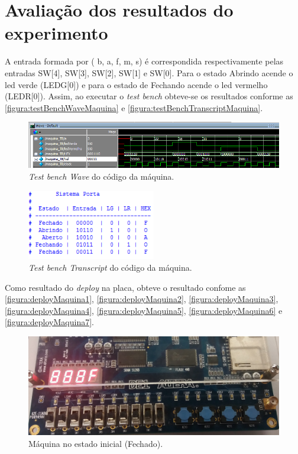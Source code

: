 \chapter{Avaliação dos resultados do experimento}
	A entrada formada por ( b, a, f, m, s) é correspondida respectivamente pelas entradas
	SW[4], SW[3], SW[2], SW[1] e SW[0]. Para o estado Abrindo acende o \ac{led} verde (LEDG[0]) e
	para o estado de Fechando acende o \ac{led} vermelho (LEDR[0]). Assim, ao executar o
	\textit{test bench} obteve-se os resultados conforme as
	\autoref{figura:testBenchWaveMaquina} e \autoref{figura:testBenchTranscriptMaquina}.

	\begin{figure}[H]
		 \centering
		 \caption{\label{figura:testBenchWaveMaquina}\textit{Test bench Wave} do código da máquina.}
		 \includegraphics[width=1\textwidth]{img/maquina/testBenchWave}
	\end{figure}

	\begin{figure}[H]
		 \centering
		 \caption{\label{figura:testBenchTranscriptMaquina}\textit{Test bench Transcript} do código da máquina.}
		 \includegraphics[width=0.5\textwidth]{img/maquina/testBenchTranscript}
	\end{figure}

	Como resultado do \textit{deploy} na placa, obteve o resultado confome as
	\autoref{figura:deployMaquina1}, \autoref{figura:deployMaquina2}, \autoref{figura:deployMaquina3},
	\autoref{figura:deployMaquina4}, \autoref{figura:deployMaquina5}, \autoref{figura:deployMaquina6} e
	\autoref{figura:deployMaquina7}.

		\begin{figure}[H]
			\includegraphics[width=1\textwidth]{img/maquina/placa/Fechado}
			\caption{Máquina no estado inicial (Fechado).\label{figura:deployMaquina1}}
		\end{figure}

